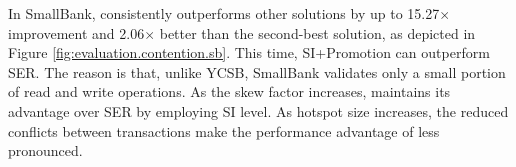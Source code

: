 In SmallBank, \sysname consistently outperforms other solutions by up to 15.27$\times$ improvement and 2.06$\times$ better than the second-best solution, as depicted in Figure \ref{fig:evaluation.contention.sb}. This time, SI+Promotion can outperform SER. The reason is that, unlike YCSB, SmallBank validates only a small portion of read and write operations. As the skew factor increases, \sysname maintains its advantage over SER by employing SI level. 
As hotspot size increases, the reduced conflicts between transactions make the performance advantage of \sysname less pronounced. 



